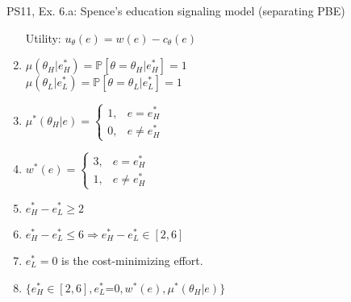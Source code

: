 \begin{frame}{PS11, Ex. 6.a: Spence’s education signaling model (separating PBE)}
\begin{multicols}{2}
\begin{enumerate}
        \item[Utility:] \vspace{-4pt}$u_\theta(e)=w(e)-c_\theta(e)$
        \item $\mu\left(\theta_H|e_H^*\right)=
               \mathbb{P}\left[\theta=\theta_H|e_H^*\right]=1$\\
              $\mu\left(\theta_L|e_L^*\right)=
               \mathbb{P}\left[\theta=\theta_L|e_L^*\right]=1$
        \item $\mu^*(\theta_H|e)=\left\{\begin{array}{ll}
                  1, & e = e_H^* \\
                  0, & e \neq e_H^*
               \end{array}\right.$
        \item $w^*(e)=\left\{\begin{array}{ll}
                  3, & e = e_H^* \\
                  1, & e \neq e_H^*
               \end{array}\right.$
        \item $e_H^*-e_L^*\geq2$
        \item $e_H^*-e_L^*\leq6\Rightarrow e_H^*-e_L^*\in[2,6]$
        \item $e_L^*=0$ is the cost-minimizing effort.
        \item $\{e_H^*\in[2,6],e_L^*$=$0,w^*(e),\mu^*(\theta_H|e)\}$
      \end{enumerate}
    \end{multicols}
    \vfill\null
\end{frame}
